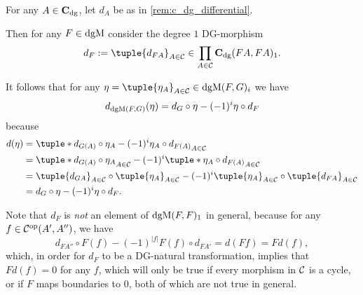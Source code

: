 \begin{remark}
    For any \( A \in \operatorname{\mathbf{C}}_{\operatorname{dg}} \), let \( d_A \) be as in \autoref{rem:c_dg_differential}.

    Then for any \( F \in \operatorname{dgM} \) consider the degree \( 1 \) DG-morphism
    \[
        d_F := \tuple{d_{FA}}_{A \in \Cc} \in \prod_{A \in \Cc} \C_{\dg}(FA, FA)_1.
    \]

    It follows that for any \( \eta = \tuple{\eta_A}_{A \in \Cc} \in \dgM(F, G)_i \) we have
    \[
        d_{\operatorname{dgM}(F, G)}(\eta) = d_G \circ \eta - (-1)^i \eta \circ d_F
    \]
    because
    \begin{align*}
        d(\eta) &= \tuple*{ d_{G(A)} \circ \eta_A - (-1)^i \eta_A \circ d_{F(A)} }_{A \in \Cc} \\
        &= \tuple*{ d_{G(A)} \circ \eta_A }_{A \in \Cc} - (-1)^i \tuple*{ \eta_A \circ d_{F(A)} }_{A \in \Cc} \\
        &= \tuple{d_{G A}}_{A \in \Cc} \circ \tuple{\eta_A}_{A \in \Cc} - (-1)^i \tuple{\eta_A}_{A \in \Cc} \circ \tuple{d_{F A}}_{A \in \Cc} \\
        &= d_G \circ \eta - (-1)^i \eta \circ d_F.
    \end{align*}
\end{remark}

Note that \( d_F \) is \emph{not} an element of \( \operatorname{dgM}(F, F)_1 \) in general, because for any \( f \in {\mathcal{C}}^{\operatorname{op}}(A', A'') \), we have
\[
    d_{F A''} \circ F(f) - (-1)^{|f|} F(f) \circ d_{F A'} = d(F f) = F d(f),
\]
which, in order for \( d_F \) to be a DG-natural transformation, implies that \( F d(f) = 0 \) for any \( f \), which will only be true if every morphism in \( {\mathcal{C}} \) is a cycle, or if \( F \) maps boundaries to \( 0 \), both of which are not true in general.
